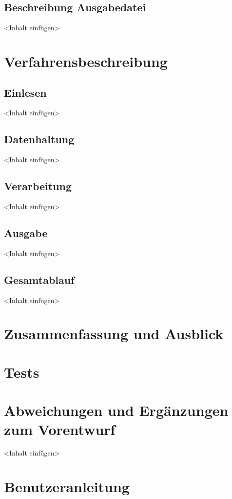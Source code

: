 \documentclass[a4paper,12pt]{report}
\begin{document}
\section{Beschreibung Ausgabedatei}
<Inhalt einfügen>

\chapter{Verfahrensbeschreibung}

\section{Einlesen}
<Inhalt einfügen>

\section{Datenhaltung}
<Inhalt einfügen>

\section{Verarbeitung}
<Inhalt einfügen>

\section{Ausgabe}
<Inhalt einfügen>

\section{Gesamtablauf}
<Inhalt einfügen>

\chapter{Zusammenfassung und Ausblick}

\chapter {Tests}


\appendix
\chapter{Abweichungen und Ergänzungen zum Vorentwurf}
<Inhalt einfügen>

\chapter{Benutzeranleitung}
\end{document}
